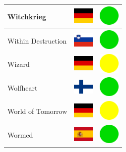 \documentclass[12pt, a4paper, twoside]{report}
\begin{document}
\begin{center}
\begin{longtable}{|p{5cm}|p{2cm}|p{2cm}|}
Witchkrieg & \includegraphics[width=1cm]{4x3/de} & \includegraphics[width=1cm]{likes/y} \\ \hline
Within Destruction & \includegraphics[width=1cm]{4x3/si} & \includegraphics[width=1cm]{likes/y} \\ \hline
Wizard & \includegraphics[width=1cm]{4x3/de} & \includegraphics[width=1cm]{likes/m} \\ \hline
Wolfheart & \includegraphics[width=1cm]{4x3/fi} & \includegraphics[width=1cm]{likes/y} \\ \hline
World of Tomorrow & \includegraphics[width=1cm]{4x3/de} & \includegraphics[width=1cm]{likes/m} \\ \hline
Wormed & \includegraphics[width=1cm]{4x3/es} & \includegraphics[width=1cm]{likes/y} \\ \hline

\end{longtable}
\end{center}
\end{document}
